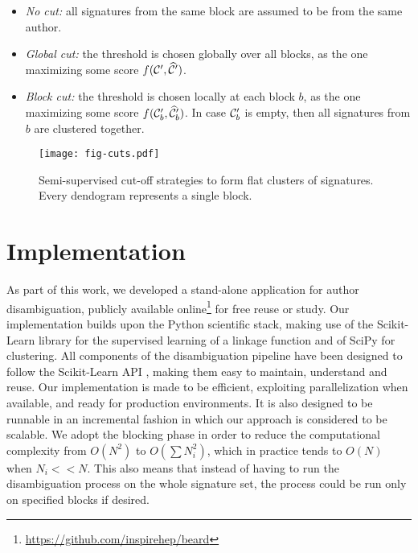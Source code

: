 \documentclass[runningheads,a4paper]{llncs}
\newcommand{\longpage}{\enlargethispage{1.5\baselineskip}}
\begin{document}
\begin{itemize}

\item \textit{No cut:} all signatures from the same block are assumed to be from the same author.

\item \textit{Global cut:} the threshold is chosen globally over all blocks,
    as the one maximizing some score $f({\cal C}^\prime, \widehat{\cal C}^\prime)$.

\item \textit{Block cut:} the threshold is chosen locally at each block $b$,
    as the one maximizing some score $f({\cal C}_b^\prime, \widehat{\cal C}_b^\prime)$.
    In case ${\cal C}_b^\prime$ is empty, then all signatures from $b$ are clustered together.
\end{itemize}

\begin{figure*}
\centering
\texttt{[image: fig-cuts.pdf]}
\caption{Semi-supervised cut-off strategies to form flat clusters of signatures. Every
dendogram represents a single block.}
\label{fig:cuts}
\end{figure*}




\section{Implementation}
\label{implementation}

\longpage

As part of this work, we developed a stand-alone application for author
disambiguation, publicly available online\footnote{\url{https://github.com/inspirehep/beard}} for free reuse
or study.
Our implementation builds upon the Python scientific stack, making
use of the Scikit-Learn library \cite{scikitlearn} for the supervised learning
of a linkage function and of SciPy for clustering.
All components of the disambiguation pipeline have been designed to follow the
Scikit-Learn API \cite{scikitlearnAPI}, making them easy to maintain,
understand and reuse.
Our implementation is made to be efficient, exploiting parallelization when available, and ready for production environments.
It is also designed to be runnable in an incremental fashion in which our approach is considered to be scalable. We adopt the blocking phase in order to reduce the computational complexity from $O(N^2)$ to $O(\sum N_i^2)$, which in practice tends to ${O(N)}$ when $N_i << N$. This also means that instead of having to run the disambiguation process on the whole signature set, the process could be run only on specified blocks if desired.
\end{document}
